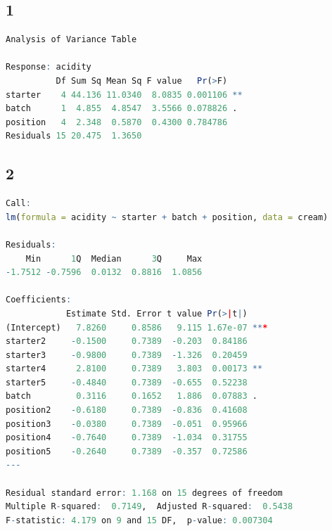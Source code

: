 \documentclass{article}
\begin{document}
    \subsection*{1}
      \begin{lstlisting}[language=R]
Analysis of Variance Table

Response: acidity
          Df Sum Sq Mean Sq F value   Pr(>F)   
starter    4 44.136 11.0340  8.0835 0.001106 **
batch      1  4.855  4.8547  3.5566 0.078826 . 
position   4  2.348  0.5870  0.4300 0.784786   
Residuals 15 20.475  1.3650                    
      \end{lstlisting}
      
    
    \subsection*{2}
      \begin{lstlisting}[language=R]
Call:
lm(formula = acidity ~ starter + batch + position, data = cream)

Residuals:
    Min      1Q  Median      3Q     Max 
-1.7512 -0.7596  0.0132  0.8816  1.0856 

Coefficients:
            Estimate Std. Error t value Pr(>|t|)    
(Intercept)   7.8260     0.8586   9.115 1.67e-07 ***
starter2     -0.1500     0.7389  -0.203  0.84186    
starter3     -0.9800     0.7389  -1.326  0.20459    
starter4      2.8100     0.7389   3.803  0.00173 ** 
starter5     -0.4840     0.7389  -0.655  0.52238    
batch         0.3116     0.1652   1.886  0.07883 .  
position2    -0.6180     0.7389  -0.836  0.41608    
position3    -0.0380     0.7389  -0.051  0.95966    
position4    -0.7640     0.7389  -1.034  0.31755    
position5    -0.2640     0.7389  -0.357  0.72586    
---

Residual standard error: 1.168 on 15 degrees of freedom
Multiple R-squared:  0.7149,  Adjusted R-squared:  0.5438 
F-statistic: 4.179 on 9 and 15 DF,  p-value: 0.007304
      \end{lstlisting}
      \label{tble:estimates}
\end{document}
